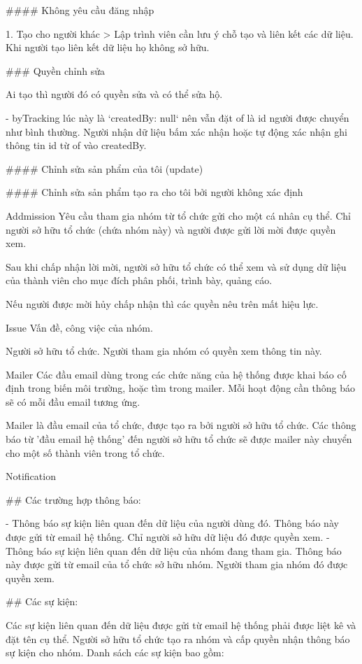 \#\#\#\# Không yêu cầu đăng nhập

1. Tạo cho người khác
> Lập trình viên cần lưu ý chỗ tạo và liên kết các dữ liệu. Khi người tạo liên kết dữ liệu họ không sở hữu.

\#\#\# Quyền chỉnh sửa

Ai tạo thì người đó có quyền sửa và có thể sửa hộ.

- byTracking lúc này là `createdBy: null` nên vẫn đặt of là id người được chuyển như bình thường. Người nhận dữ liệu bấm xác nhận hoặc tự động xác nhận ghi thông tin id từ of vào createdBy.

\#\#\#\# Chỉnh sửa sản phẩm của tôi (update)

\#\#\#\# Chỉnh sửa sản phẩm tạo ra cho tôi bởi người không xác định



Addmission
Yêu cầu tham gia nhóm từ tổ chức gửi cho một cá nhân cụ thể. Chỉ người sở hữu tổ chức (chứa nhóm này) và người được gửi
lời mời được quyền xem.

Sau khi chấp nhận lời mời, người sở hữu tổ chức có thể xem và sử dụng dữ liệu của thành viên cho mục đích phân phối,
trình bày, quảng cáo.

Nếu người được mời hủy chấp nhận thì các quyền nêu trên mất hiệu lực.

Issue
Vấn đề, công việc của nhóm.

Người sở hữu tổ chức. Người tham gia nhóm có quyền xem thông tin này.

Mailer
Các đầu email dùng trong các chức năng của hệ thống được khai báo cố định trong biến môi trường, hoặc tìm trong mailer.
Mỗi hoạt động cần thông báo sẽ có mỗi đầu email tương ứng.

Mailer là đầu email của tổ chức, được tạo ra bởi người sở hữu tổ chức. Các thông báo từ 'đầu email hệ thống' đến người
sở hữu tổ chức sẽ được mailer này chuyển cho một số thành viên trong tổ chức.

Notification

\#\# Các trường hợp thông báo:

-   Thông báo sự kiện liên quan đến dữ liệu của người dùng đó. Thông báo này được gửi từ email hệ thống. Chỉ người sở
hữu dữ liệu đó được quyền xem.
-   Thông báo sự kiện liên quan đến dữ liệu của nhóm đang tham gia. Thông báo này được gửi từ email của tổ chức sở hữu
nhóm. Người tham gia nhóm đó được quyền xem.

\#\# Các sự kiện:

Các sự kiện liên quan đến dữ liệu được gửi từ email hệ thống phải được liệt kê và đặt tên cụ thể. Người sở hữu tổ chức
tạo ra nhóm và cấp quyền nhận thông báo sự kiện cho nhóm. Danh sách các sự kiện bao gồm:

